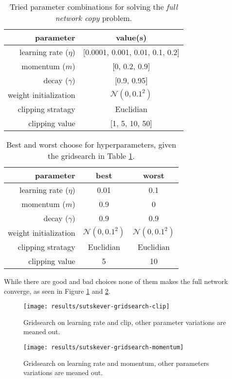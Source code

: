 \begin{table}[h]
\centering
\begin{tabular}{r|c}
	parameter & value(s) \\ \hline
	learning rate ($\eta$) & [0.0001, 0.001, 0.01, 0.1, 0.2] \\
	momentum ($m$) & [0, 0.2, 0.9] \\
	decay ($\gamma$) & [0.9, 0.95] \\
	weight initialization & $\mathcal{N}(0, 0.1^2)$ \\
	clipping stratagy & Euclidian \\
	clipping value & [1, 5, 10, 50]
\end{tabular}
\caption{Tried parameter combinations for solving the \textit{full network copy} problem.}
\label{table:resutls:sutskever:gridsearch-range}
\end{table}
\begin{table}[h]
\vspace{-0.5cm}
\centering
\begin{tabular}{r|c|c}
	parameter & best & worst  \\ \hline
	learning rate ($\eta$) & 0.01 & 0.1 \\
	momentum ($m$) & 0.9 & 0 \\
	decay ($\gamma$) & 0.9 & 0.9 \\
	weight initialization & $\mathcal{N}(0, 0.1^2)$ & $\mathcal{N}(0, 0.1^2)$ \\
	clipping stratagy & Euclidian & Euclidian \\
	clipping value & 5 & 10
\end{tabular}
\caption{Best and worst choose for hyperparameters, given the gridsearch in Table \ref{table:resutls:sutskever:gridsearch-range}.}
\end{table}

While there are good and bad choices none of them makes the full network converge, as seen in Figure \ref{fig:results:sutskever:gridsearch-clip} and \ref{fig:results:sutskever:gridsearch-momentum}.
\begin{figure}[h]
	\centering
	\texttt{[image: results/sutskever-gridsearch-clip]}
	\caption{Gridsearch on learning rate and clip, other parameter variations are meaned out.}
	\label{fig:results:sutskever:gridsearch-clip}
\end{figure}
\begin{figure}[H]
	\centering
	\texttt{[image: results/sutskever-gridsearch-momentum]}
	\caption{Gridsearch on learning rate and momentum, other parameters variations are meaned out.}
	\label{fig:results:sutskever:gridsearch-momentum}
\end{figure}

